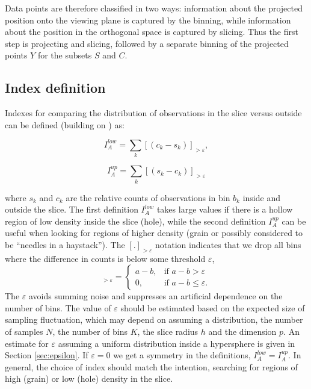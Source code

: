 \documentclass[]{interact}
\theoremstyle{plain}%
\theoremstyle{definition}
\theoremstyle{remark}
\begin{document}
Data points are therefore classified in two ways: information about the
projected position onto the viewing plane is captured by the binning,
while information about the position in the orthogonal space is captured
by slicing. Thus the first step is projecting and slicing, followed by a
separate binning of the projected points \(Y\) for the subsets \(S\) and
\(C\).

\hypertarget{index-definition}{%
\subsection{Index definition}\label{index-definition}}

Indexes for comparing the distribution of observations in the slice
versus outside can be defined (building on
\citet{doi:10.1198/1061860043119}) as:

\begin{equation}
I_A^{low} = \sum_{k}\left[\left(c_{k}-s_{k}\right)\right]_{>\varepsilon},
\label{eq:index}
\end{equation}

\begin{equation}
I_A^{up} = \sum_{k}\left[\left(s_{k}-c_{k}\right)\right]_{>\varepsilon}
\label{eq:indexup}
\end{equation}

\noindent where \(s_{k}\) and \(c_{k}\) are the relative counts of
observations in bin \(b_{k}\) inside and outside the slice. The first
definition \(I_A^{low}\) takes large values if there is a hollow region
of low density inside the slice (hole), while the second definition
\(I_A^{up}\) can be useful when looking for regions of higher density
(grain or possibly considered to be ``needles in a haystack''). The
\([.]_{>\varepsilon}\) notation indicates that we drop all bins where
the difference in counts is below some threshold \(\varepsilon\),
\begin{equation}
[a - b]_{>\varepsilon} = \begin{cases}
    a - b, & \text{if $a - b > \varepsilon$}\\
    0, & \text{if $a-b \leq \varepsilon$.}
  \end{cases}
\end{equation} The \(\varepsilon\) avoids summing noise and suppresses
an artificial dependence on the number of bins. The value of
\(\varepsilon\) should be estimated based on the expected size of
sampling fluctuation, which may depend on assuming a distribution, the
number of samples \(N\), the number of bins \(K\), the slice radius
\(h\) and the dimension \(p\). An estimate for \(\varepsilon\) assuming
a uniform distribution inside a hypersphere is given in Section
\ref{sec:epsilon}. If \(\varepsilon=0\) we get a symmetry in the
definitions, \(I_A^{low}=I_A^{up}\). In general, the choice of index
should match the intention, searching for regions of high (grain) or low
(hole) density in the slice.
\end{document}
